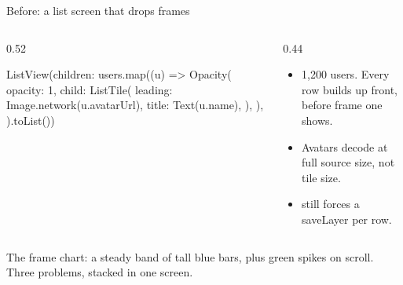 \documentclass[10pt,aspectratio=169,t]{beamer}
\begin{document}
\begin{frame}[fragile,eyebrow=Profiling]{Before: a list screen that drops frames}
  \begin{columns}[T]
    \begin{column}{0.52\textwidth}
\begin{dart}
ListView(children: users.map((u) =>
  Opacity(
    opacity: 1,
    child: ListTile(
      leading: Image.network(u.avatarUrl),
      title: Text(u.name),
    ),
  ),
).toList())
\end{dart}
    \end{column}
    \begin{column}{0.44\textwidth}
      \begin{itemize}
        \item 1,200 users. Every row builds up front, before frame one shows.
        \item Avatars decode at full source size, not tile size.
        \item {} still forces a saveLayer per row.
      \end{itemize}
    \end{column}
  \end{columns}
  \begin{takeaway}{The frame chart: a steady band of tall blue bars, plus green spikes on scroll.}
    Three problems, stacked in one screen.
  \end{takeaway}
\end{frame}
\end{document}
